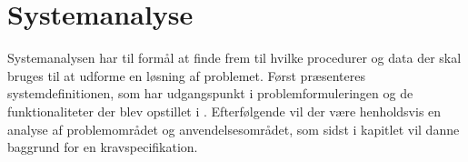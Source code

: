 \chapter{Systemanalyse}\label{chapter:systemanalyse}
Systemanalysen har til formål at finde frem til hvilke procedurer og data der skal bruges til at udforme en løsning af problemet.
Først præsenteres systemdefinitionen, som har udgangspunkt i problemformuleringen og de funktionaliteter der blev opstillet i .
Efterfølgende vil der være henholdsvis en analyse af problemområdet og anvendelsesområdet, som sidst i kapitlet vil danne baggrund for en kravspecifikation.






